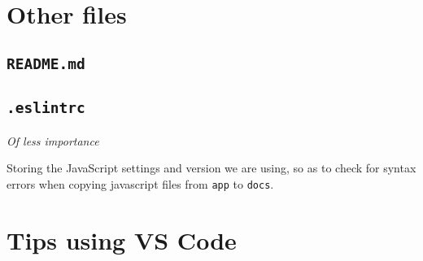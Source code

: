 \section{Other files}

\subsection{\texttt{README.md}}

\subsection{\texttt{.eslintrc}}

\textit{Of less importance}

Storing the JavaScript settings and version we are using, so as to check for syntax errors when copying javascript files from \texttt{app} to \texttt{docs}.

\section{Tips using VS Code}

